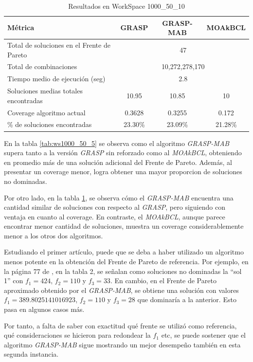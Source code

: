 \documentclass[12pt,a4paper]{book}
\begin{document}
\begin{table}[H]
\centering
\caption{Resultados en WorkSpace 1000\_50\_10}
\label{tab:ws1000_50_10}
\begin{tabular}{|l|c|c|c|}
\hline
\textbf{Métrica} & \textbf{GRASP} & \textbf{GRASP-MAB} & \textbf{MOAkBCL} \\ \hline
Total de soluciones en el Frente de Pareto
    & \multicolumn{3}{c|}{47} \\ \hline
Total de combinaciones 
    & \multicolumn{3}{c|}{10,272,278,170} \\ \hline
Tiempo medio de ejecución (seg) 
    & \multicolumn{3}{c|}{2.8} \\ \hline
Soluciones medias totales encontradas & 10.95 & 10.85 & 10 \\ \hline
Coverage algoritmo actual & 0.3628 & 0.3255 & 0.172 \\ \hline
\% de soluciones encontradas & 23.30\% & 23.09\% & 21.28\% \\ \hline
\end{tabular}
\end{table}

En la tabla \ref{tab:ws1000_50_5} se observa como el algoritmo \textit{GRASP-MAB} supera tanto a la versión \textit{GRASP} sin reforzado como al \textit{MOAkBCL}, obteniendo en promedio más de una solución adicional del Frente de Pareto.
Además, al presentar un coverage menor, logra obtener una mayor proporcion de soluciones no dominadas.

Por otro lado, en la tabla \ref{tab:ws1000_50_10}, se observa cómo el \textit{GRASP-MAB} encuentra una cantidad similar de soluciones con respecto al \textit{GRASP}, pero siguiendo con ventaja en cuanto al coverage.
En contraste, el \textit{MOAkBCL}, aunque parece encontrar menor cantidad de soluciones, muestra un coverage considerablemente menor a los otros dos algoritmos. 

Estudiando el primer artículo, puede que se deba a haber utilizado un algoritmo menos potente en la obtención del Frente de Pareto de referencia. Por ejemplo, en la página 77 de \cite{k-balanced_1}, en la tabla 2,
se señalan como soluciones no dominadas la ``sol 1'' con $f_1=424$, $f_2=110$ y $f_3=33$. En cambio, en el Frente de Pareto aproximado obtenido por el \textit{GRASP-MAB}, se obtiene una solución con valores $f_1=389.8025141016923$, $f_2=110$ y $f_3=28$ que dominaría a la anterior. Esto
pasa en algunos casos más.

Por tanto, a falta de saber con exactitud qué frente se utilizó como referencia, qué consideraciones se hicieron para redondear la $f_1$ etc, se puede sostener
que el algoritmo \textit{GRASP-MAB} sigue mostrando un mejor desempeño también en esta segunda instancia.
\end{document}
